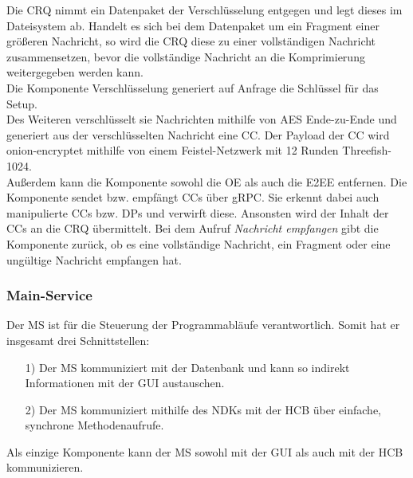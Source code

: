 Die \ac{CRQ} nimmt ein Datenpaket der Verschlüsselung entgegen und legt dieses im Dateisystem ab. Handelt es sich bei dem Datenpaket um ein Fragment einer größeren Nachricht, so wird die \ac{CRQ} diese zu einer vollständigen Nachricht zusammensetzen, bevor die vollständige Nachricht an die Komprimierung weitergegeben werden kann.\\
\newline
Die Komponente Verschlüsselung generiert auf Anfrage die Schlüssel für das Setup.\\
Des Weiteren verschlüsselt sie Nachrichten mithilfe von \ac{AES} Ende-zu-Ende und generiert aus der verschlüsselten Nachricht eine \ac{CC}. Der Payload der \ac{CC} wird onion-encryptet mithilfe von einem Feistel-Netzwerk mit 12 Runden Threefish-1024.\\
Außerdem kann die Komponente sowohl die \ac{OE} als auch die \ac{E2EE} entfernen.
Die Komponente sendet bzw. empfängt \acp{CC} über \ac{gRPC}. Sie erkennt dabei auch manipulierte \acp{CC} bzw. \acp{DP} und verwirft diese. Ansonsten wird der Inhalt der \acp{CC} an die \ac{CRQ} übermittelt.
Bei dem Aufruf \textit{Nachricht empfangen} gibt die Komponente zurück, ob es eine vollständige Nachricht, ein Fragment oder eine ungültige Nachricht empfangen hat.

\subsubsection{Main-Service}
Der \ac{MS} ist für die Steuerung der Programmabläufe verantwortlich. Somit hat er insgesamt drei Schnittstellen:
\begin{itemize}
\item[1)]Der \ac{MS} kommuniziert mit der Datenbank und kann so indirekt Informationen mit der \ac{GUI} austauschen.
\item[2)]Der \ac{MS} kommuniziert mithilfe des \acp{NDK} mit der \ac{HCB} über einfache, synchrone Methodenaufrufe.
\end{itemize}
Als einzige Komponente kann der \ac{MS} sowohl mit der \ac{GUI} als auch mit der \ac{HCB} kommunizieren.